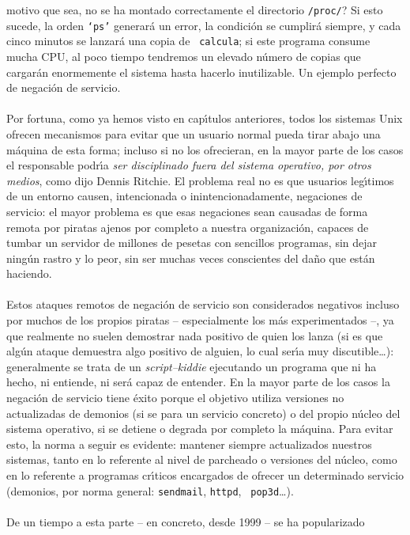 motivo que sea, no se ha montado correctamente el directorio {\tt /proc/}? Si 
esto sucede, la orden {\tt `ps'} generar\'a un error, la condici\'on se 
cumplir\'a siempre, y cada cinco minutos se lanzar\'a una copia de {\tt 
calcula}; si este programa consume mucha CPU, al poco tiempo tendremos un 
elevado n\'umero de copias que cargar\'an enormemente el sistema hasta hacerlo 
inutilizable. Un ejemplo perfecto de negaci\'on de servicio.\\
\\Por fortuna, como ya hemos visto en cap\'{\i}tulos anteriores, todos los 
sistemas Unix ofrecen mecanismos para evitar que un usuario normal pueda tirar
abajo una m\'aquina de esta forma; incluso si no los ofrecieran, en la mayor
parte de los casos el responsable podr\'{\i}a {\it ser disciplinado fuera del
sistema operativo, por otros medios}, como dijo Dennis Ritchie. El problema 
real no es que usuarios leg\'{\i}timos de un entorno causen, intencionada o
inintencionadamente, negaciones de servicio: el mayor problema es que esas
negaciones sean causadas de forma remota por piratas ajenos por completo a 
nuestra organizaci\'on, capaces de tumbar un servidor de millones de pesetas 
con sencillos programas, sin dejar ning\'un rastro y lo peor, sin ser muchas
veces conscientes del da\~no que est\'an haciendo.\\
\\Estos ataques remotos de negaci\'on de servicio son considerados negativos
incluso por muchos de los propios piratas -- especialmente los m\'as 
experimentados --, ya que realmente no suelen demostrar nada positivo de quien
los lanza (si es que alg\'un ataque demuestra algo positivo de alguien, lo cual
ser\'{\i}a muy discutible\ldots): generalmente se trata de un {\it 
script--kiddie} ejecutando un programa que ni ha hecho, ni entiende, ni ser\'a
capaz de entender. En la mayor parte de los casos la negaci\'on de servicio 
tiene \'exito porque el objetivo utiliza versiones no actualizadas de demonios
(si se para un servicio concreto) o del propio n\'ucleo del sistema operativo, 
si se detiene o degrada por completo la m\'aquina. Para evitar esto, la norma a
seguir es evidente: mantener siempre actualizados nuestros sistemas, tanto en
lo referente al nivel de parcheado o versiones del n\'ucleo, como en lo 
referente a programas cr\'{\i}ticos encargados de ofrecer un determinado 
servicio (demonios, por norma general: {\tt sendmail}, {\tt httpd}, {\tt 
pop3d}\ldots).\\
\\De un tiempo a esta parte -- en concreto, desde 1999 -- se ha popularizado 
